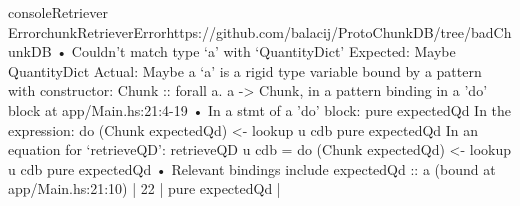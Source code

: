 \begin{codeSnippet}{console}{Retriever Error}{chunkRetrieverError}{https://github.com/balacij/ProtoChunkDB/tree/badChunkDB}
    • Couldn't match type ‘a’ with ‘QuantityDict’
      Expected: Maybe QuantityDict
        Actual: Maybe a
      ‘a’ is a rigid type variable bound by
        a pattern with constructor: Chunk :: forall a. a -> Chunk,
        in a pattern binding in
             a 'do' block
        at app/Main.hs:21:4-19
    • In a stmt of a 'do' block: pure expectedQd
      In the expression:
        do (Chunk expectedQd) <- lookup u cdb
           pure expectedQd
      In an equation for ‘retrieveQD’:
          retrieveQD u cdb
            = do (Chunk expectedQd) <- lookup u cdb
                 pure expectedQd
    • Relevant bindings include
        expectedQd :: a (bound at app/Main.hs:21:10)
   |
22 |   pure expectedQd
   |   ^^^^^^^^^^^^^^^
\end{codeSnippet}
